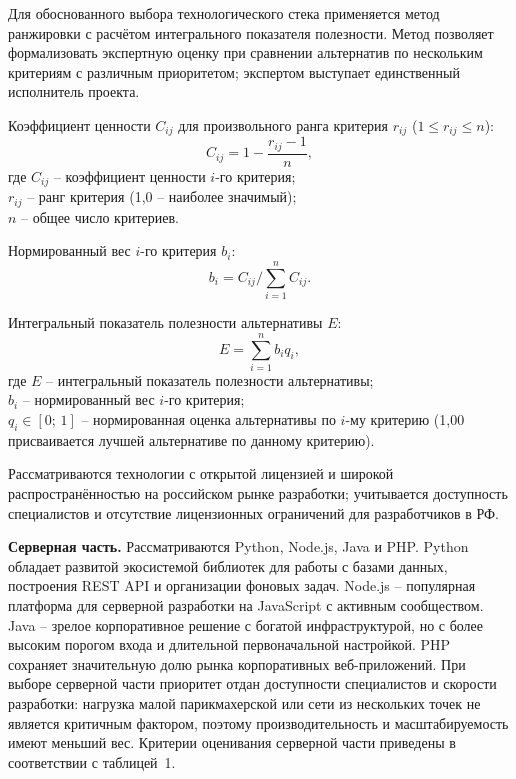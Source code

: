 
Для обоснованного выбора технологического стека применяется метод
ранжировки с расчётом интегрального показателя полезности. Метод
позволяет формализовать экспертную оценку при сравнении альтернатив по
нескольким критериям с различным приоритетом; экспертом выступает
единственный исполнитель проекта.

Коэффициент ценности $C_{ij}$ для произвольного ранга критерия $r_{ij}$
($1 \leqslant r_{ij} \leqslant n$):
\[
C_{ij} = 1 - \frac{r_{ij} - 1}{n}, \tag{1}
\]
\noindent
где $C_{ij}$ -- коэффициент ценности $i$-го критерия;\\
$r_{ij}$ -- ранг критерия (1,0 -- наиболее значимый);\\
$n$ -- общее число критериев.

Нормированный вес $i$-го критерия $b_i$:
\[
b_i = C_{ij} \Big/ \sum_{i=1}^{n} C_{ij}. \tag{2}
\]

Интегральный показатель полезности альтернативы $E$:
\[
E = \sum_{i=1}^{n} b_i q_i, \tag{3}
\]
\noindent
где $E$ -- интегральный показатель полезности альтернативы;\\
$b_i$ -- нормированный вес $i$-го критерия;\\
$q_i \in [0;\,1]$ -- нормированная оценка альтернативы по $i$-му критерию
(1,00 присваивается лучшей альтернативе по данному критерию).


Рассматриваются технологии с открытой лицензией и широкой
распространённостью на российском рынке разработки; учитывается
доступность специалистов и отсутствие лицензионных ограничений для
разработчиков в РФ.

\textbf{Серверная часть.} Рассматриваются Python, Node.js, Java и PHP.
Python обладает развитой экосистемой библиотек для работы с базами
данных, построения REST API и организации фоновых задач. Node.js --
популярная платформа для серверной разработки на JavaScript с активным
сообществом. Java -- зрелое корпоративное решение с богатой
инфраструктурой, но с более высоким порогом входа и длительной
первоначальной настройкой. PHP сохраняет значительную долю рынка
корпоративных веб-приложений. При выборе серверной части приоритет
отдан доступности специалистов и скорости разработки: нагрузка малой
парикмахерской или сети из нескольких точек не является критичным
фактором, поэтому производительность и масштабируемость имеют меньший
вес. Критерии оценивания серверной части приведены в соответствии с таблицей~1.

